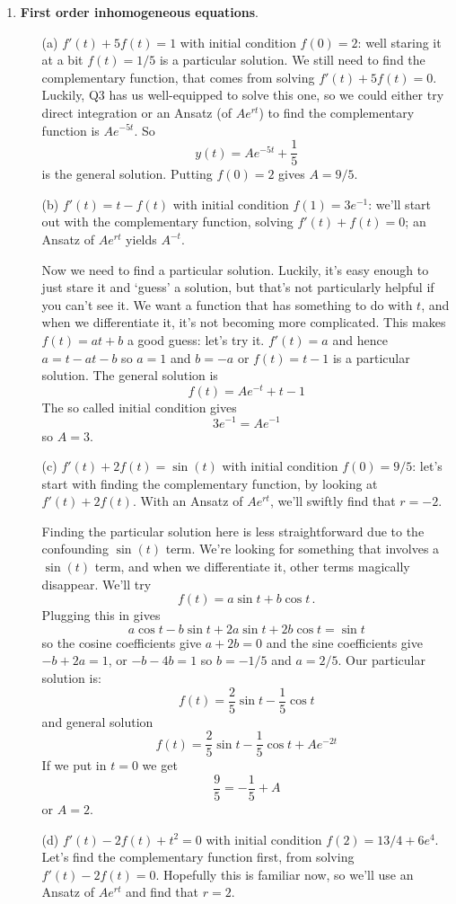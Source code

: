 \documentclass[11pt,a4paper]{scrartcl}
\begin{document}
\begin{enumerate}
\item \textbf{First order inhomogeneous equations}.
	\begin{itemize}
	\item[(a)] $f'(t) + 5f(t) = 1$ with initial condition $f(0) = 2$: well staring it at a bit $f(t)=1/5$ is a particular solution. We still need to find the complementary function, that comes from solving $f'(t) + 5f(t) =0$. Luckily, Q3 has us well-equipped to solve this one, so we could either try direct integration or an Ansatz (of $Ae^{rt}$) to find the complementary function is $Ae^{-5t}$.
    So
          $$y(t)=Ae^{-5t}+\frac{1}{5}$$
          is the general solution. Putting $f(0)=2$ gives $A=9/5$.
          
	\item[(b)] $f'(t) = t - f(t)$ with initial condition $f(1) = 3e^{-1}$: 
    we'll start out with the complementary function, solving $f'(t) + f(t) =0$; an Ansatz of $Ae^{rt}$ yields $A^{-t}$.
    
    Now we need to find a particular solution. Luckily, it's easy enough to just stare it and `guess' a solution, but that's not particularly helpful if you can't see it. We want a function that has something to do with $t$, and when we differentiate it, it's not becoming more complicated. This makes $f(t)=at+b$ a good guess: let's try it. $f'(t)=a$ and hence $a=t-at-b$ so $a=1$ and $b=-a$ or $f(t)=t-1$ is a particular solution. The general solution is
          $$f(t)=Ae^{-t}+t-1$$
          The so called initial condition gives
          $$3e^{-1}=Ae^{-1}$$
          so $A=3$.
          
	\item[(c)] $f'(t) +2f(t) = \sin(t)$ with initial condition $f(0) = 9/5$: 
    let's start with finding the complementary function, by looking at $f'(t)+2f(t)$. With an Ansatz of $Ae^{rt}$, we'll swiftly find that $r = -2$. 

    Finding the particular solution here is less straightforward due to the confounding $\sin(t)$ term. We're looking for something that involves a $\sin(t)$ term, and when we differentiate it, other terms magically disappear.  We'll try
          $$f(t)=a\sin{t}+b\cos{t}\,.$$
    Plugging this in gives 
          $$a\cos{t}-b\sin{t}+2a\sin{t}+2b\cos{t}=\sin{t}$$
          so the cosine coefficients give $a+2b=0$ and the sine coefficients give $-b+2a=1$, or $-b-4b=1$ so $b=-1/5$ and $a=2/5$. Our particular solution is:
          $$f(t)=\frac{2}{5}\sin{t}-\frac{1}{5}\cos{t}$$
          and general solution
          $$f(t)=\frac{2}{5}\sin{t}-\frac{1}{5}\cos{t}+Ae^{-2t}$$
          If we put in $t=0$ we get
          $$\frac{9}{5}=-\frac{1}{5}+A$$
          or $A=2$.          
	\item[(d)] $f'(t) - 2f(t) + t^2 = 0$ with initial condition $f(2) = 13/4 + 6e^4$. 
    Let's find the complementary function first, from solving $f'(t)-2f(t) = 0$. Hopefully this is familiar now, so we'll use an Ansatz of $Ae^{rt}$ and find that $r = 2$.
    

\end{itemize}
\end{enumerate}
\end{document}
